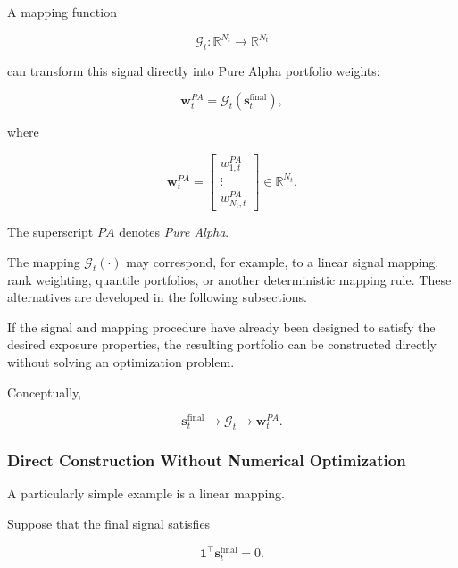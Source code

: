 \documentclass[11pt,a4paper]{article}
\begin{document}
A mapping function

\begin{equation}
\mathcal{G}_t:
\mathbb{R}^{N_t}
\rightarrow
\mathbb{R}^{N_t}
\end{equation}

can transform this signal directly into Pure Alpha portfolio weights:

\begin{equation}
\boxed{
\mathbf{w}_t^{PA}
=
\mathcal{G}_t
\left(
\mathbf{s}_t^{\mathrm{final}}
\right),
}
\end{equation}

where

\begin{equation}
\mathbf{w}_t^{PA}
=
\begin{bmatrix}
w_{1,t}^{PA}\\
\vdots\\
w_{N_t,t}^{PA}
\end{bmatrix}
\in
\mathbb{R}^{N_t}.
\end{equation}

The superscript $PA$ denotes \emph{Pure Alpha}.

The mapping $\mathcal{G}_t(\cdot)$ may correspond, for example, to a linear
signal mapping, rank weighting, quantile portfolios, or another deterministic
mapping rule. These alternatives are developed in the following subsections.

If the signal and mapping procedure have already been designed to satisfy the
desired exposure properties, the resulting portfolio can be constructed
directly without solving an optimization problem.

Conceptually,

\begin{equation}
\boxed{
\mathbf{s}_t^{\mathrm{final}}
\rightarrow
\mathcal{G}_t
\rightarrow
\mathbf{w}_t^{PA}.
}
\end{equation}


\subsubsection{Direct Construction Without Numerical Optimization}

A particularly simple example is a linear mapping.

Suppose that the final signal satisfies

\begin{equation}
\mathbf{1}^{\top}
\mathbf{s}_t^{\mathrm{final}}
=
0.
\end{equation}
\end{document}
